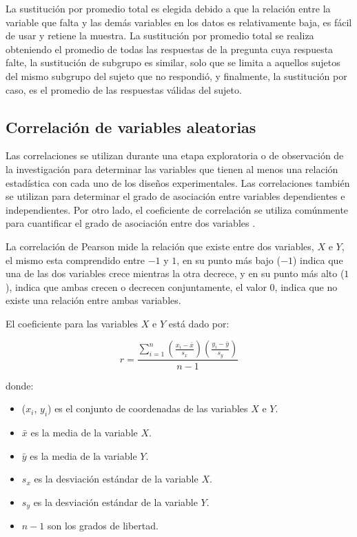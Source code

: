 La sustitución por promedio total es elegida debido a que la relación entre la
variable que falta y las demás variables en los datos es relativamente baja, es
fácil de usar y retiene la muestra. La sustitución por promedio total se realiza
obteniendo el promedio de todas las respuestas de la pregunta cuya respuesta
falte, la sustitución de subgrupo es similar, solo que se limita a aquellos
sujetos del mismo subgrupo del sujeto que no respondió, y finalmente, la
sustitución por caso, es el promedio de las respuestas válidas del sujeto.

\subsection{Correlación de variables aleatorias}
\label{sec:correlacion}

Las correlaciones se utilizan durante una etapa exploratoria o de observación de
la investigación para determinar las variables que tienen al menos una relación
estadística con cada uno de los diseños experimentales. Las correlaciones
también se utilizan para determinar el grado de asociación entre variables
dependientes e independientes. Por otro lado, el coeficiente de correlación se
utiliza comúnmente para cuantificar el grado de asociación entre dos variables
\cite{BoslaughStatistics2008}.

La correlación de Pearson\cite{BoslaughStatistics2008} mide la relación que
existe entre dos variables, $X$ e $Y$, el mismo esta comprendido entre $-1$ y
$1$, en su punto más bajo ($-1$) indica que una de las dos variables crece mientras
la otra decrece, y en su punto más alto ($1$), indica que ambas crecen o
decrecen conjuntamente, el valor $0$, indica que no existe una relación entre
ambas variables.

El coeficiente para las variables $X$ e $Y$ está dado por:

\begin{equation}
r = \frac{\sum_{i=1}^n{(\frac{x_i-\bar{x}}{s_x})({\frac{y_i-\bar{y}}{s_y}})}}%
{n - 1}
\end{equation}

donde:

\begin{itemize}
    \item ($x_i$, $y_i$) es el conjunto de coordenadas de las variables $X$ e $Y$.
    \item $\bar{x}$ es la media de la variable $X$.
    \item $\bar{y}$ es la media de la variable $Y$.
    \item $s_x$ es la desviación estándar de la variable $X$.
    \item $s_y$ es la desviación estándar de la variable $Y$.
    \item $n - 1$ son los grados de libertad.
\end{itemize}
